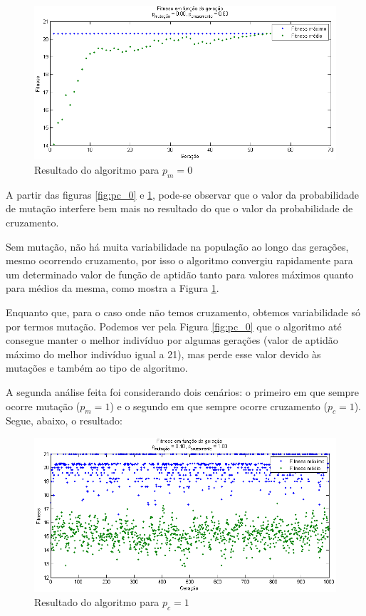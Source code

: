 \documentclass[12pt]{elsarticle}
\begin{document}
	\begin{figure}[h]
		\centering
		\includegraphics[width=17cm]{img/pm_0.png}
		\caption{Resultado do algoritmo para $p_{m}=0$}
		\label{fig:pm_0}
	\end{figure}
	
	A partir das figuras \ref{fig:pc_0} e \ref{fig:pm_0}, pode-se observar que o valor da probabilidade de mutação interfere bem mais no resultado do que o valor da probabilidade de cruzamento.
	
	Sem mutação, não há muita variabilidade na população ao longo das gerações, mesmo ocorrendo cruzamento, por isso o algoritmo convergiu rapidamente para um determinado valor de função de aptidão tanto para valores máximos quanto para médios da mesma, como mostra a Figura \ref{fig:pm_0}.
	
	Enquanto que, para o caso onde não temos cruzamento, obtemos variabilidade só por termos mutação. Podemos ver pela Figura \ref{fig:pc_0} que o algoritmo até consegue manter o melhor indivíduo por algumas gerações (valor de aptidão máximo do melhor indivíduo igual a 21), mas perde esse valor devido às mutações e também ao tipo de algoritmo.
	
	A segunda análise feita foi considerando dois cenários: o primeiro em que sempre ocorre mutação ($p_m=1$) e o segundo em que sempre ocorre cruzamento ($p_c=1$). Segue, abaixo, o resultado:
	\newpage
	\begin{figure}[h]
		\centering
		\includegraphics[width=13cm]{img/pc_1.png}
		\caption{Resultado do algoritmo para $p_{c}=1$}
		\label{fig:pc_1}
	\end{figure}
	
\end{document}
